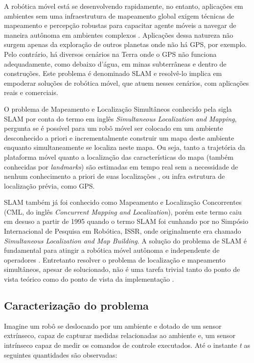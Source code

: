 
A robótica móvel está se desenvolvendo rapidamente, no entanto, aplicações 
em ambientes sem uma infraestrutura de mapeamento global exigem técnicas 
de mapeamento e percepção robustas para capacitar agente móveis a 
navegar de maneira autônoma em ambientes complexos \cite{saeedi2016multiple}. Aplicações dessa 
natureza não surgem apenas da exploração de outros planetas onde não há 
GPS, por exemplo. Pelo contrário, há diversos cenários na Terra onde o 
GPS não funciona adequadamente, como debaixo d'água, 
em minas subterrâneas e dentro de construções. Este problema é denominado SLAM e resolvê-lo implica em empoderar soluções de robótica móvel, 
que atuem nesses cenários, com aplicações reais e comerciais.

O problema de Mapeamento e Localização Simultâneos conhecido pela sigla SLAM por conta do termo em inglês \textit{Simultaneous Localization and Mapping}, pergunta se é possível para um robô móvel ser colocado em um ambiente desconhecido a priori e incrementalmente construir um mapa deste ambiente enquanto simultaneamente se localiza neste mapa. Ou seja, tanto a trajetória da plataforma móvel quanto a localização das características do mapa (também conhecidas por \textit{landmarks}) são estimadas em tempo real sem a necessidade de nenhum conhecimento a priori de suas localizações \cite{durrant2006simultaneous}, ou infra estrutura de localização prévia, como GPS.

SLAM também já foi conhecido como Mapeamento e Localização Concorrentes (CML, do inglês \textit{Concurrent Mapping and Localization}), porém este termo caiu em desuso a partir de 1995 quando o termo SLAM foi cunhando por  no Simpósio Internacional de Pesquisa em Robótica, ISSR, onde originalmente era chamado \textit{Simultaneous Localization and Map Building}. A solução do problema de SLAM é fundamental para atingir a robótica móvel autônoma e independente de operadores \cite{durrant2006simultaneous}. Entretanto resolver o problema de localização e mapeamento simultâneos, apesar de solucionado, não é uma tarefa trivial tanto do ponto de vista teórico como do ponto de vista da implementação \cite{durrant1996localization}.

\subsection*{Caracterização do problema}
Imagine um robô se deslocando por um ambiente e dotado de um sensor extrínseco, capaz de capturar medidas relacionadas ao 
ambiente e, um sensor intrínseco capaz de medir os comandos de 
controle executados. Até o instante \emph{t} as seguintes 
quantidades são observadas:

